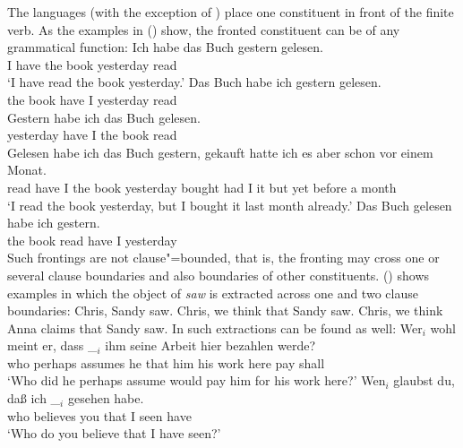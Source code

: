 The  languages (with the exception of ) place one constituent in front of the finite
verb. As the  examples in () show, the fronted constituent can be of any grammatical function:
\eal
\ex 
\gll Ich habe das Buch gestern gelesen.\\
     I have the book yesterday read\\\german
\glt `I have read the book yesterday.'
\ex 
\gll Das Buch habe ich gestern gelesen.\\
     the book have I yesterday read\\
\ex 
\gll Gestern habe ich das Buch gelesen.\\
     yesterday have I the book read\\
\ex 
\gll Gelesen habe ich das Buch gestern, gekauft hatte ich es aber schon vor einem Monat.\\
     read have I the book yesterday bought had I it but yet before a month\\
\glt `I read the book yesterday, but I bought it last month already.'
\ex 
\gll Das Buch gelesen habe ich gestern.\\
     the book read    have I yesterday\\
\zl
Such frontings are not clause"=bounded, that is, the fronting may cross one or several clause boundaries
and also boundaries of other constituents. () shows  examples in which the object of
\emph{saw} is extracted across one and two clause boundaries:
\eal
\ex\label{ex-chris-we-saw} Chris, Sandy saw.
\ex\label{ex-chris-we-think-that-sandy-saw} Chris, we think that Sandy saw.
\ex Chris, we think Anna claims that Sandy saw.
\zl
In  such extractions can be found as well:
\eal
\label{ex-fernabhaengigkeit-one}
\ex 
\gll Wer$_i$ wohl    meint   er, dass \_$_i$ ihm seine Arbeit hier bezahlen werde?\footnotemark\\
     who     perhaps assumes he  that {}     him his   work   here pay shall\\
\glt `Who did he perhaps assume would pay him for his work here?'
\ex
\label{ex-wen-glaubst-du-dass}
\gll Wen$_i$ glaubst du, daß ich \_$_i$ gesehen habe.\footnotemark\\
     who believes you that I {} seen have\\\german
{}
\glt `Who do you believe that I have seen?'
